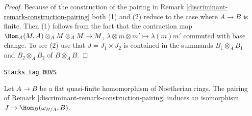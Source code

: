 \begin{proof}

Because of the construction of the pairing in
Remark \ref{discriminant-remark-construction-pairing}
both (1) and (2) reduce to the case where $A \to B$ is finite.
Then (1) follows from the fact that the contraction map
$\Hom_A(M, A) \otimes_A M \otimes_A M \to M$,
$\lambda \otimes m \otimes m' \mapsto \lambda(m)m'$
commuted with base change. To see (2) use that
$J = J_1 \times J_2$ is contained in the summands
$B_1 \otimes_A B_1$ and $B_2 \otimes_A B_2$
of $B \otimes_A B$.
\end{proof}

\begin{lemma}
\label{discriminant-lemma-noether-pairing-flat-quasi-finite}
\href{https://stacks.math.columbia.edu/tag/0BVS}{\texttt{Stacks tag 0BVS}}

Let $A \to B$ be a flat quasi-finite homomorphism of Noetherian rings.
The pairing of Remark \ref{discriminant-remark-construction-pairing} induces an isomorphism
$J \to \Hom_B(\omega_{B/A}, B)$.
\end{lemma}

